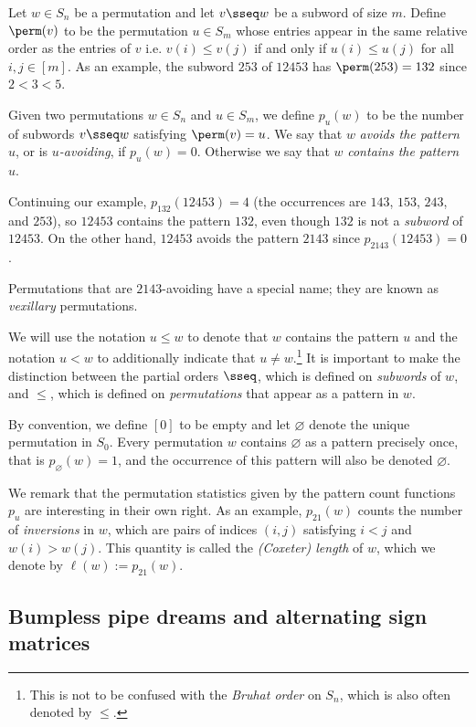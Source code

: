 Let $w\in S_n$ be a permutation and let 
$v\sseq w$ be a subword of size $m$.
Define $\perm(v)$ to be the permutation $u\in S_m$ whose entries appear in the same relative order as the entries of $v$ i.e. $v(i) \leq v(j)$ if and only if $u(i) \leq u(j)$ for all $i,j\in [m]$.
As an example, the subword $253$ of $12453$ has $\perm(253) = 132$ since $2<3<5$.

Given two permutations $w\in S_n$ and $u\in S_m$,
we define $p_u(w)$ to be the number of subwords $v\sseq w$ satisfying $\perm(v) = u$.
We say that $w$ \textit{avoids the pattern} $u$, or is \textit{$u$-avoiding}, if $p_u(w) = 0$.
Otherwise we say that $w$ \textit{contains the pattern} $u$.

Continuing our example, $p_{132}(12453) = 4$ (the occurrences are $143$, $153$, $243$, and $253$), so $12453$ contains the pattern $132$, even though $132$ is not a \textit{subword} of $12453$.
On the other hand, $12453$ avoids the pattern $2143$ since $p_{2143}(12453) = 0$.

Permutations that are $2143$-avoiding have a special name; they are known as \textit{vexillary} permutations.

We will use the notation $u\leq w$ to denote that $w$ contains the pattern $u$ and the notation $u< w$ to additionally indicate that $u\neq w$.\footnote{
    This is not to be confused with the \textit{Bruhat order} on $S_n$, which is also often denoted by $\leq$.
}
It is important to make the distinction between the partial orders $\sseq$, which is defined on \textit{subwords} of $w$, and $\leq$, which is defined on \textit{permutations} that appear as a pattern in $w$.

By convention, we define $[0]$ to be empty and let $\varnothing$ denote the unique permutation in $S_0$.
Every permutation $w$ contains $\varnothing$ as a pattern precisely once, that is $p_\varnothing(w) = 1$, and the occurrence of this pattern will also be denoted $\varnothing$.

We remark that the permutation statistics given by the pattern count functions $p_u$ are interesting in their own right.
As an example, $p_{21}(w)$ counts the number of \textit{inversions} in $w$, which are pairs of indices $(i,j)$ satisfying $i<j$ and $w(i)>w(j)$.
This quantity is called the \textit{\textup{(}Coxeter\textup{)} length} of $w$, which we denote by $\ell(w) := p_{21}(w)$.



\subsection{Bumpless pipe dreams and alternating sign matrices}
\label{sect:bpd}

